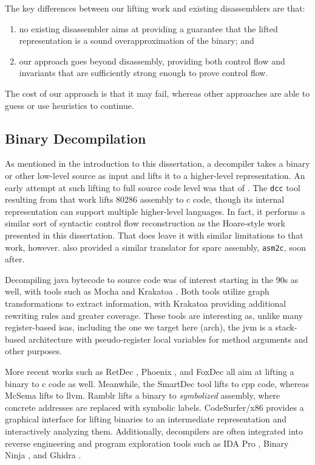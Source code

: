 The key differences between our lifting work and existing disassemblers are that:
\begin{enumerate}
  \item no existing disassembler aims at providing a guarantee that the lifted representation is a sound overapproximation of the binary; and
  \item our approach goes beyond disassembly, providing both control flow and invariants that are sufficiently strong enough to prove control flow.
\end{enumerate}
The cost of our approach is that it may fail, whereas other approaches are able to guess or use heuristics to continue.

\subsection{Binary Decompilation}\label{related-decompilation}
As mentioned in the introduction to this dissertation, a decompiler takes a binary or other low-level source as input and lifts it to a higher-level representation.
An early attempt at such lifting to full source code level was that of \textcite{cifuentes1995decompilation}.
The \lstinline|dcc| tool resulting from that work lifts \gls{80286} assembly to \gls{c} code, though its internal representation can support multiple higher-level languages.
In fact, it performs a similar sort of syntactic control flow reconstruction as the Hoare-style work presented in this dissertation.
That does leave it with similar limitations to that work, however.
\Textcite{cifuentes1998assembly} also provided a similar translator for \ac{sparc} assembly, \lstinline|asm2c|, soon after.

Decompiling \gls{java} bytecode to source code was of interest starting in the 90s as well, with tools such as Mocha \autocite{mocha} and Krakatoa \autocite{proebsting1997krakatoa}.
Both tools utilize graph transformations to extract information, with Krakatoa providing additional rewriting rules and greater coverage.
These tools are interesting as, unlike many register-based \acp{isa}, including the one we target here (\gls{arch}), the \ac{jvm} is a stack-based architecture with pseudo-register local variables for method arguments and other purposes.

More recent works such as RetDec \autocite{retdec}, Phoenix \autocite{brumley2013native}, and FoxDec \autocite{verbeek2020sound} all aim at lifting a binary to \gls{c} code as well.
Meanwhile, the SmartDec tool \autocite{fokin2011smartdec} lifts to \gls{cpp} code, whereas McSema \autocite{dinaburg2014mcsema} lifts to \gls{llvm}.
Ramblr \autocite{wang2017ramblr} lifts a binary to \emph{symbolized} assembly, where concrete addresses are replaced with symbolic labels.
CodeSurfer/\gls{x86} \autocite{balakrishnan2004analyzing,balakrishnan2005codesurfer}
provides a graphical interface for lifting binaries to an intermediate representation and interactively analyzing them.
Additionally, decompilers are often integrated into reverse engineering and program exploration tools such as IDA Pro \autocite{ida-decompiler},
Binary Ninja \autocite{binary-ninja-decompiler}, and Ghidra \autocite{ghidra}.

